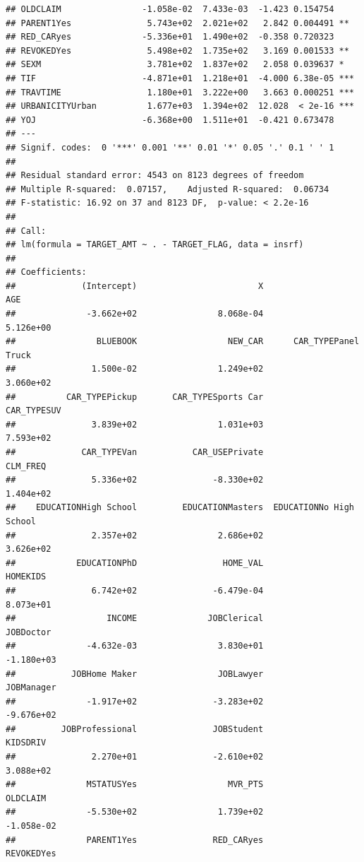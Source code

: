 \documentclass[]{article}
\begin{document}
\begin{verbatim}
## OLDCLAIM                -1.058e-02  7.433e-03  -1.423 0.154754    
## PARENT1Yes               5.743e+02  2.021e+02   2.842 0.004491 ** 
## RED_CARyes              -5.336e+01  1.490e+02  -0.358 0.720323    
## REVOKEDYes               5.498e+02  1.735e+02   3.169 0.001533 ** 
## SEXM                     3.781e+02  1.837e+02   2.058 0.039637 *  
## TIF                     -4.871e+01  1.218e+01  -4.000 6.38e-05 ***
## TRAVTIME                 1.180e+01  3.222e+00   3.663 0.000251 ***
## URBANICITYUrban          1.677e+03  1.394e+02  12.028  < 2e-16 ***
## YOJ                     -6.368e+00  1.511e+01  -0.421 0.673478    
## ---
## Signif. codes:  0 '***' 0.001 '**' 0.01 '*' 0.05 '.' 0.1 ' ' 1
## 
## Residual standard error: 4543 on 8123 degrees of freedom
## Multiple R-squared:  0.07157,    Adjusted R-squared:  0.06734 
## F-statistic: 16.92 on 37 and 8123 DF,  p-value: < 2.2e-16
## 
## Call:
## lm(formula = TARGET_AMT ~ . - TARGET_FLAG, data = insrf)
## 
## Coefficients:
##             (Intercept)                        X                      AGE  
##              -3.662e+02                8.068e-04                5.126e+00  
##                BLUEBOOK                  NEW_CAR      CAR_TYPEPanel Truck  
##               1.500e-02                1.249e+02                3.060e+02  
##          CAR_TYPEPickup       CAR_TYPESports Car              CAR_TYPESUV  
##               3.839e+02                1.031e+03                7.593e+02  
##             CAR_TYPEVan           CAR_USEPrivate                 CLM_FREQ  
##               5.336e+02               -8.330e+02                1.404e+02  
##    EDUCATIONHigh School         EDUCATIONMasters  EDUCATIONNo High School  
##               2.357e+02                2.686e+02                3.626e+02  
##            EDUCATIONPhD                 HOME_VAL                 HOMEKIDS  
##               6.742e+02               -6.479e-04                8.073e+01  
##                  INCOME              JOBClerical                JOBDoctor  
##              -4.632e-03                3.830e+01               -1.180e+03  
##           JOBHome Maker                JOBLawyer               JOBManager  
##              -1.917e+02               -3.283e+02               -9.676e+02  
##         JOBProfessional               JOBStudent                 KIDSDRIV  
##               2.270e+01               -2.610e+02                3.088e+02  
##              MSTATUSYes                  MVR_PTS                 OLDCLAIM  
##              -5.530e+02                1.739e+02               -1.058e-02  
##              PARENT1Yes               RED_CARyes               REVOKEDYes  

\end{verbatim}
\end{document}
